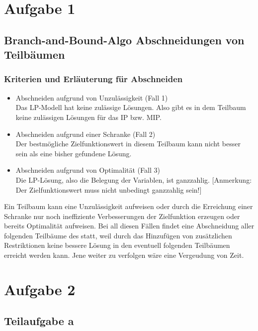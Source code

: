 \documentclass[a4paper,11pt]{article}
\begin{document}
\raggedright %

\section*{Aufgabe 1}

\subsection*{Branch-and-Bound-Algo Abschneidungen von Teilbäumen} 
\subsubsection*{Kriterien und Erläuterung für Abschneiden}
    \begin{itemize}
        \item {Abschneiden aufgrund von Unzulässigkeit (Fall 1) \\
                Das LP-Modell hat keine zulässige Lösungen. Also gibt es in dem Teilbaum keine zulässigen Lösungen für das IP bzw. MIP.
            }
        \item {Abschneiden aufgrund einer Schranke (Fall 2) \\
                Der bestmögliche Zielfunktionswert in diesem Teilbaum kann nicht besser sein als eine bisher gefundene Lösung.
            }
        \item {Abschneiden aufgrund von Optimalität (Fall 3) \\
                Die LP-Lösung, also die Belegung der Variablen, ist ganzzahlig. [Anmerkung: Der Zielfunktionswert muss nicht unbedingt ganzzahlig sein!]
            }
    \end{itemize}
    Ein Teilbaum kann eine Unzulässigkeit aufweisen oder durch die Erreichung einer Schranke nur noch ineffiziente Verbesserungen der Zielfunktion erzeugen oder bereits Optimalität aufweisen. Bei all diesen Fällen findet eine Abschneidung aller folgenden Teilbäume des statt, weil durch das Hinzufügen von zusätzlichen Restriktionen keine bessere Lösung in den eventuell folgenden Teilbäumen erreicht werden kann. Jene weiter zu verfolgen wäre eine Vergeudung von Zeit.
\bigbreak

\section*{Aufgabe 2}

\subsection*{Teilaufgabe a}
\end{document}
